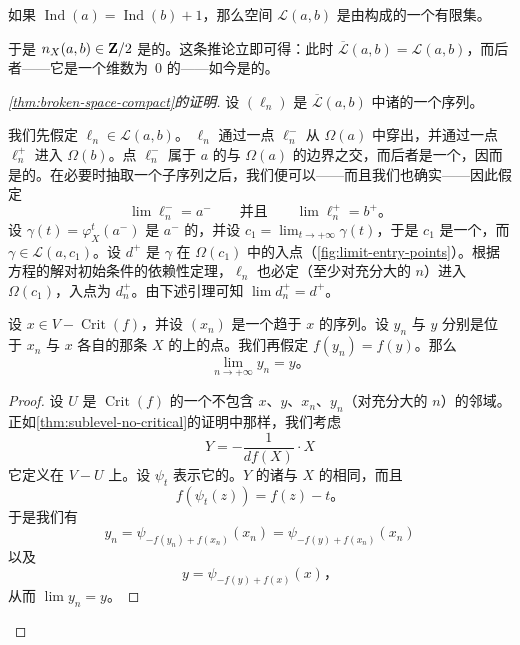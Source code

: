\begin{corollary}\label{thm:finite-trajectories}
如果 $\operatorname{Ind}(a)=\operatorname{Ind}(b)+1$，那么空间 $\mathcal{L}(a,b)$ 是由\trTrajectory{}构成的一个有限集。
\end{corollary}

于是 $n_X(a,b)\in\mathbf{Z}/2$ 是\trWellDefined{}的。这条推论立即可得：此时 $\overline{\mathcal{L}}(a,b)=\mathcal{L}(a,b)$，而后者——它是一个维数为~0 的\trManifold——如今是\trCompact{}的。\noqed

\begin{proof}[\cref{thm:broken-space-compact}的证明]
设 $(\ell_n)$ 是 $\overline{\mathcal{L}}(a,b)$ 中诸\trTrajectory{}的一个序列。

我们先假定 $\ell_n\in\mathcal{L}(a,b)$。\trTrajectory{} $\ell_n$ 通过一点 $\ell_n^-$ 从 $\Omega(a)$ 中穿出，并通过一点 $\ell_n^+$ 进入 $\Omega(b)$。点 $\ell_n^-$ 属于 $a$ 的\trUnstableManifold{}与 $\Omega(a)$ 的边界之交，而后者是一个\trSphere，因而是\trCompact{}的。在必要时抽取一个子序列之后，我们便可以——而且我们也确实——因此假定
\[
\lim\ell_n^-=a^-\qquad\text{并且}\qquad \lim\ell_n^+=b^+\text{。}
\]
设 $\gamma(t)=\varphi_X^t(a^-)$ 是 $a^-$ 的\trTrajectory，并设 $c_1=\lim_{t\to+\infty}\gamma(t)$，于是 $c_1$ 是一个\trCriticalPoint{}，而 $\gamma\in\mathcal{L}(a,c_1)$。设 $d^+$ 是 $\gamma$ 在 $\Omega(c_1)$ 中的入点（\cref{fig:limit-entry-points}）。根据\trDifferential{}方程的解对初始条件的依赖性定理，$\ell_n$ 也必定（至少对充分大的 $n$）进入 $\Omega(c_1)$，入点为 $d_n^+$。由下述引理可知 $\lim d_n^+=d^+$。

\begin{lemma}\label{thm:same-level-convergence}
设 $x\in V-\operatorname{Crit}(f)$，并设 $(x_n)$ 是一个趋于 $x$ 的序列。设 $y_n$ 与 $y$ 分别是位于 $x_n$ 与 $x$ 各自的那条 $X$ 的\trTrajectory{}上的点。我们再假定 $f(y_n)=f(y)$。那么
\[
\lim_{n\to+\infty}y_n=y\text{。}
\]
\end{lemma}

\begin{proof}
设 $U$ 是 $\operatorname{Crit}(f)$ 的一个不包含 $x$、$y$、$x_n$、$y_n$（对充分大的 $n$）的邻域。正如\cref{thm:sublevel-no-critical}的证明中那样，我们考虑\trVectorField
\[
Y=-\frac{1}{df(X)}\cdot X
\]
它定义在 $V-U$ 上。设 $\psi_t$ 表示它的\trFlow。$Y$ 的诸\trTrajectory{}与 $X$ 的相同，而且
\[
f(\psi_t(z))=f(z)-t\text{。}
\]
于是我们有
\[
y_n=\psi_{-f(y_n)+f(x_n)}(x_n)=\psi_{-f(y)+f(x_n)}(x_n)
\]
以及
\[
y=\psi_{-f(y)+f(x)}(x)\text{，}
\]
从而 $\lim y_n=y$。
\end{proof}


\end{proof}
